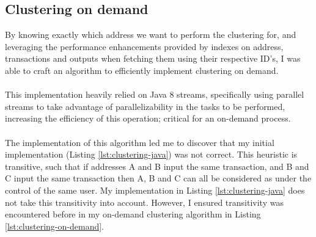 \subsection{Clustering on demand}
By knowing exactly which address we want to perform the clustering for, and leveraging the performance enhancements provided by indexes on address, transactions and outputs when fetching them using their respective ID's, I was able to craft an algorithm to efficiently implement clustering on demand.
\\\\
This implementation heavily relied on Java 8 streams, specifically using parallel streams to take advantage of parallelizability in the tasks to be performed, increasing the efficiency of this operation; critical for an on-demand process. 
\\\\
The implementation of this algorithm led me to discover that my initial implementation (Listing \ref{lst:clustering-java}) was not correct. This heuristic is transitive, such that if addresses A and B input the same transaction, and B and C input the same transaction then A, B and C can all be considered as under the control of the same user. My implementation in Listing \ref{lst:clustering-java} does not take this transitivity into account. However, I ensured transitivity was encountered before in my on-demand clustering algorithm in Listing \ref{lst:clustering-on-demand}.

